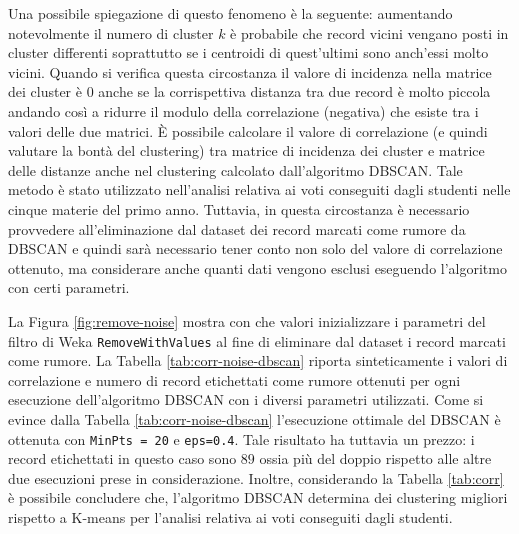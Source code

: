 \documentclass[12pt]{article}
\begin{document}
Una possibile spiegazione di questo fenomeno è la seguente: aumen\-tando notevolmente il numero di cluster $k$ è probabile che record vicini vengano posti in cluster differenti soprattutto se i centroidi di quest'ultimi sono anch'essi molto vicini. 
Quando si verifica questa circostanza il valore di incidenza nella matrice dei cluster è $0$ anche se la corrispettiva distanza tra due record è molto piccola andando così a ridurre il modulo della correlazione (negativa) che esiste tra i valori delle due matrici. 
È possibile calcolare il valore di correlazione (e quindi valutare la bontà del cluste\-ring) tra matrice di incidenza dei cluster e matrice delle distanze anche nel clustering calcolato dall'algoritmo DBSCAN. 
Tale metodo è stato utilizza\-to nell'analisi relativa ai voti conseguiti dagli studenti nelle cinque materie del primo anno. 
Tuttavia, in questa circostanza è necessario provvedere all'eliminazione dal dataset dei record marcati come rumore da DBSCAN e quindi sarà necessario tener conto non solo del valore di correlazione ottenuto, ma considerare anche quanti dati vengono esclusi eseguendo l'algoritmo con certi parametri. 

La Figura \ref{fig:remove-noise} mostra con che valori inizializzare i parametri del filtro di Weka \texttt{RemoveWithValues} al fine di eliminare dal dataset i record marcati come rumore. La Tabella \ref{tab:corr-noise-dbscan} riporta sinteticamente i valori di correlazione e numero di record etichettati come rumore ottenuti per ogni esecuzione dell'algoritmo DBSCAN con i diversi parametri utilizzati. Come si evince dalla Tabella \ref{tab:corr-noise-dbscan} l'esecuzione ottimale del DBSCAN è ottenuta con \texttt{MinPts = 20} e \texttt{eps=0.4}. Tale risultato ha tuttavia un prezzo: i record etichettati in questo caso sono $89$ ossia più del doppio rispetto alle altre due esecuzioni prese in considerazione. Inoltre, considerando la Tabella \ref{tab:corr} è possibile concludere che, l'algoritmo DBSCAN determina dei clustering migliori rispetto a K-means per l'analisi relativa ai voti conseguiti dagli studenti.
\end{document}
